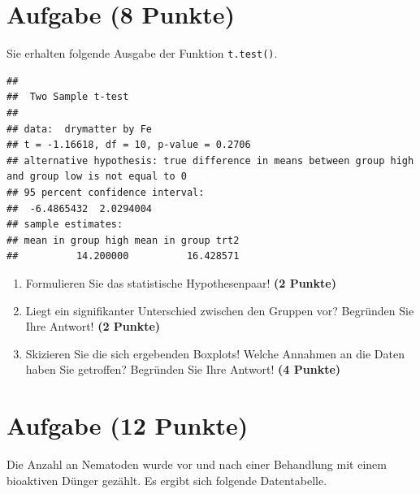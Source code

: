 \documentclass[a4paper, 10pt]{scrartcl}\usepackage[]{graphicx}\usepackage[]{color}
\makeatletter
\newenvironment{kframe}{%
 \def\at@end@of@kframe{}%
 \ifinner\ifhmode%
  \def\at@end@of@kframe{\end{minipage}}%
  \begin{minipage}{\columnwidth}%
 \fi\fi%
 \def\FrameCommand##1{\hskip\@totalleftmargin \hskip-\fboxsep
 \colorbox{shadecolor}{##1}\hskip-\fboxsep
     \hskip-\linewidth \hskip-\@totalleftmargin \hskip\columnwidth}%
 \MakeFramed {\advance\hsize-\width
   \@totalleftmargin\z@ \linewidth\hsize
   \@setminipage}}%
 {\par\unskip\endMakeFramed%
 \at@end@of@kframe}
\newenvironment{knitrout}{}{} %
\makeatother
\begin{document}
\section{Aufgabe \hfill (8 Punkte)}

Sie erhalten folgende \Rlogo Ausgabe der Funktion \texttt{t.test()}.

\begin{knitrout}
\color{fgcolor}\begin{kframe}
\begin{verbatim}
## 
## 	Two Sample t-test
## 
## data:  drymatter by Fe
## t = -1.16618, df = 10, p-value = 0.2706
## alternative hypothesis: true difference in means between group high and group low is not equal to 0
## 95 percent confidence interval:
##  -6.4865432  2.0294004
## sample estimates:
## mean in group high mean in group trt2 
##          14.200000          16.428571
\end{verbatim}
\end{kframe}
\end{knitrout}


\begin{enumerate}
  \item Formulieren Sie das statistische Hypothesenpaar! \textbf{(2
Punkte)}
\item Liegt ein signifikanter Unterschied zwischen den Gruppen vor?
  Begr{\"u}nden Sie Ihre Antwort! \textbf{(2 Punkte)}
\item Skizieren Sie die sich ergebenden Boxplots! Welche Annahmen an die Daten haben Sie getroffen? Begründen Sie Ihre Antwort! \textbf{(4 Punkte)} 
\end{enumerate}
 
\clearpage

\section{Aufgabe \hfill (12 Punkte)}

Die Anzahl an Nematoden wurde vor und nach einer Behandlung mit einem
bioaktiven D{\"u}nger gez{\"a}hlt. Es ergibt sich folgende Datentabelle.
\end{document}
